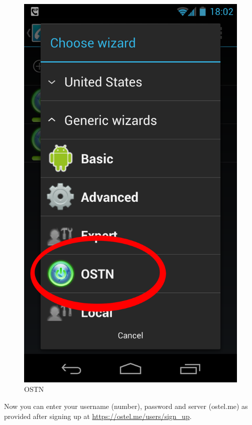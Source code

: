 \begin{figure}[htbp]
\centering
\includegraphics{ostn_1.png}
\caption{OSTN}
\end{figure}

Now you can enter your username (number), password and server (ostel.me)
as provided after signing up at
\href{https://ostel.me/users/sign\_up}{https://ostel.me/users/sign\_up}.

